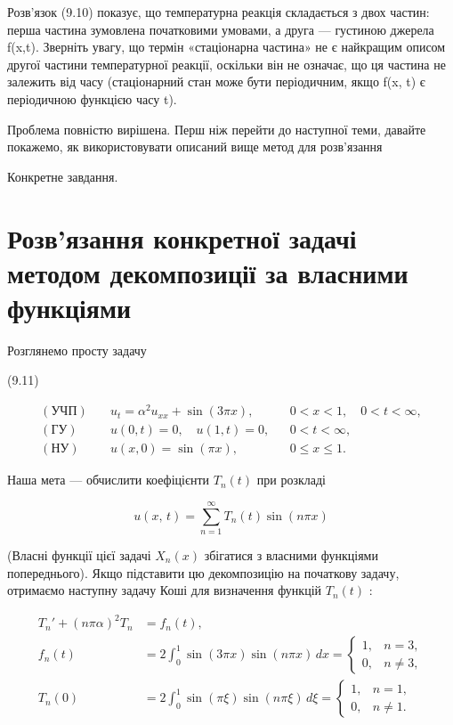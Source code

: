 \documentclass[
  ukrainian,
]{article}
\begin{document}
Розв'язок (9.10) показує, що температурна реакція складається з двох
частин: перша частина зумовлена початковими умовами, а друга ---
густиною джерела f(x,t). Зверніть увагу, що термін «стаціонарна частина»
не є найкращим описом другої частини температурної реакції, оскільки він
не означає, що ця частина не залежить від часу (стаціонарний стан може
бути періодичним, якщо f(x, t) є періодичною функцією часу t).

Проблема повністю вирішена. Перш ніж перейти до наступної теми, давайте
покажемо, як використовувати описаний вище метод для розв'язання

Конкретне завдання.

\section{Розв'язання конкретної задачі методом декомпозиції за власними
функціями}\label{ux440ux43eux437ux432ux44fux437ux430ux43dux43dux44f-ux43aux43eux43dux43aux440ux435ux442ux43dux43eux457-ux437ux430ux434ux430ux447ux456-ux43cux435ux442ux43eux434ux43eux43c-ux434ux435ux43aux43eux43cux43fux43eux437ux438ux446ux456ux457-ux437ux430-ux432ux43bux430ux441ux43dux438ux43cux438-ux444ux443ux43dux43aux446ux456ux44fux43cux438}

Розглянемо просту задачу

(9.11)

\[
\begin{aligned}
(\text{УЧП})\quad & u_t = \alpha^2 u_{xx} + \sin(3\pi x), && 0 < x < 1,\quad 0 < t < \infty, \\
(\text{ГУ})\quad & u(0,t)=0,\quad u(1,t)=0, && 0 < t < \infty, \\
(\text{НУ})\quad & u(x,0)=\sin(\pi x), && 0 \le x \le 1.
\end{aligned}
\]

Наша мета --- обчислити коефіцієнти \(T_n(t)\) при розкладі

\[
u\left(x,\,t\right)=\sum_{n=1}^{\infty}T_n(t)\sin(n\pi x)
\]

(Власні функції цієї задачі \(X_n(x)\) збігатися з власними функціями
попереднього). Якщо підставити цю декомпозицію на початкову задачу,
отримаємо наступну задачу Коші для визначення функцій \(T_n(t)\) :

\[
\begin{aligned}
T_n' + (n\pi\alpha)^2 T_n &= f_n(t), \\
f_n(t) &= 2 \int_0^1 \sin(3\pi x)\sin(n\pi x)\,dx
= \begin{cases}
1, & n = 3, \\
0, & n \ne 3,
\end{cases} \\
T_n(0) &= 2 \int_0^1 \sin(\pi \xi)\sin(n\pi \xi)\,d\xi
= \begin{cases}
1, & n = 1, \\
0, & n \ne 1.
\end{cases}
\end{aligned}
\]
\end{document}

